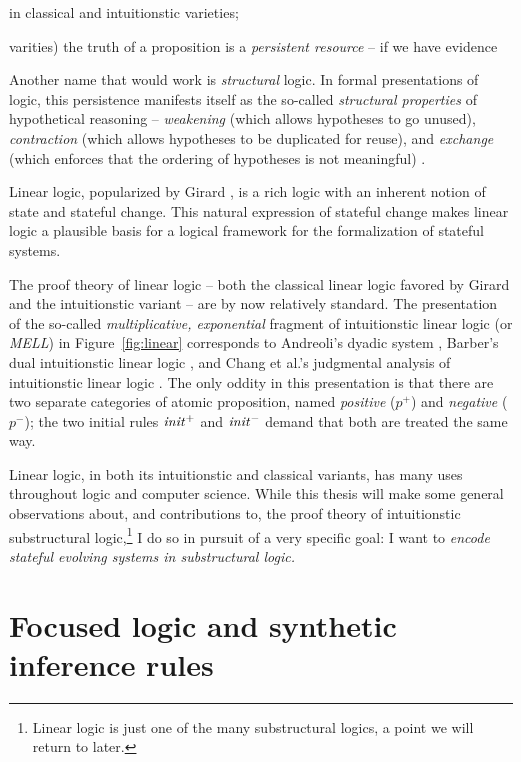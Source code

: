 in classical and intuitionstic varieties; 

varities) the truth of a proposition is a {\it persistent resource} --
if we have evidence 

Another name that would work
is {\it structural} logic. In formal presentations of logic, this
persistence manifests itself as the so-called {\it structural
  properties} of hypothetical reasoning -- {\it weakening} (which
allows hypotheses to go unused), {\it contraction} (which allows
hypotheses to be duplicated for reuse), and {\it exchange} (which
enforces that the ordering of hypotheses is not meaningful)
\cite{gentzen35untersuchungen}.

Linear logic, popularized by Girard \cite{girard87linear}, is a rich
logic with an inherent notion of state and stateful change. This
natural expression of stateful change makes linear logic a plausible
basis for a logical framework for the formalization of stateful
systems. 


The proof theory of linear logic -- both the classical linear logic
favored by Girard and the intuitionstic variant -- are by now
relatively standard. The presentation of the so-called {\it
  multiplicative, exponential} fragment of intuitionstic linear logic
(or {\it MELL}) in Figure~\ref{fig:linear} corresponds to Andreoli's
dyadic system \cite{andreoli92logic}, Barber's dual intuitionstic
linear logic \cite{barber96dual}, and Chang et al.'s judgmental
analysis of intuitionstic linear logic \cite{chang03judgmental}.  The
only oddity in this presentation is that there are two separate
categories of atomic proposition, named {\it positive} ($p^+$) and
{\it negative} ($p^-$); the two initial rules ${\it init}^+$ and ${\it
  init}^-$ demand that both are treated the same way.

Linear logic, in both its intuitionstic and classical variants, has
many uses throughout logic and computer science. While this thesis
will make some general observations about, and contributions to, the
proof theory of intuitionstic substructural logic,\footnote{Linear logic is
just one of the many substructural logics, a point we will return to
later.} I do so in pursuit of a very specific goal: I want to {\it encode
stateful evolving systems in substructural logic.}

\section{Focused logic and synthetic inference rules}


